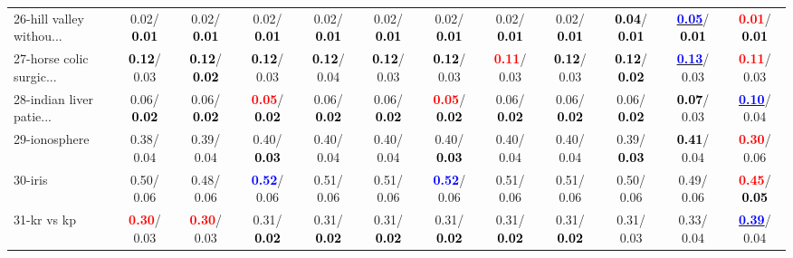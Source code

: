 \begin{table}[h]
\begin{center}
{\begin{tabular}{lc|c|c|c|c|c|c|c|c|c|c}
26-hill valley withou... &   0.02/\textcolor{black}{\textbf{  0.01}} &   0.02/\textcolor{black}{\textbf{  0.01}} &   0.02/\textcolor{black}{\textbf{  0.01}} &   0.02/\textcolor{black}{\textbf{  0.01}} &   0.02/\textcolor{black}{\textbf{  0.01}} &   0.02/\textcolor{black}{\textbf{  0.01}} &   0.02/\textcolor{black}{\textbf{  0.01}} &   0.02/\textcolor{black}{\textbf{  0.01}} & \textcolor{black}{\textbf{  0.04}}/\textcolor{black}{\textbf{  0.01}} & \underline{\textcolor{blue}{\textbf{  0.05}}}/\textcolor{black}{\textbf{  0.01}} & \textcolor{red}{\textbf{  0.01}}/\textcolor{black}{\textbf{  0.01}} \\
27-horse colic surgic... & \textcolor{black}{\textbf{  0.12}}/  0.03 & \textcolor{black}{\textbf{  0.12}}/\textcolor{black}{\textbf{  0.02}} & \textcolor{black}{\textbf{  0.12}}/  0.03 & \textcolor{black}{\textbf{  0.12}}/  0.04 & \textcolor{black}{\textbf{  0.12}}/  0.03 & \textcolor{black}{\textbf{  0.12}}/  0.03 & \textcolor{red}{\textbf{  0.11}}/  0.03 & \textcolor{black}{\textbf{  0.12}}/  0.03 & \textcolor{black}{\textbf{  0.12}}/\textcolor{black}{\textbf{  0.02}} & \underline{\textcolor{blue}{\textbf{  0.13}}}/  0.03 & \textcolor{red}{\textbf{  0.11}}/  0.03 \\
28-indian liver patie... &   0.06/\textcolor{black}{\textbf{  0.02}} &   0.06/\textcolor{black}{\textbf{  0.02}} & \textcolor{red}{\textbf{  0.05}}/\textcolor{black}{\textbf{  0.02}} &   0.06/\textcolor{black}{\textbf{  0.02}} &   0.06/\textcolor{black}{\textbf{  0.02}} & \textcolor{red}{\textbf{  0.05}}/\textcolor{black}{\textbf{  0.02}} &   0.06/\textcolor{black}{\textbf{  0.02}} &   0.06/\textcolor{black}{\textbf{  0.02}} &   0.06/\textcolor{black}{\textbf{  0.02}} & \textcolor{black}{\textbf{  0.07}}/  0.03 & \underline{\textcolor{blue}{\textbf{  0.10}}}/  0.04 \\ \hline
29-ionosphere &   0.38/  0.04 &   0.39/  0.04 &   0.40/\textcolor{black}{\textbf{  0.03}} &   0.40/  0.04 &   0.40/  0.04 &   0.40/\textcolor{black}{\textbf{  0.03}} &   0.40/  0.04 &   0.40/  0.04 &   0.39/\textcolor{black}{\textbf{  0.03}} & \textcolor{black}{\textbf{  0.41}}/  0.04 & \textcolor{red}{\textbf{  0.30}}/  0.06 \\
30-iris &   0.50/  0.06 &   0.48/  0.06 & \textcolor{blue}{\textbf{  0.52}}/  0.06 &   0.51/  0.06 &   0.51/  0.06 & \textcolor{blue}{\textbf{  0.52}}/  0.06 &   0.51/  0.06 &   0.51/  0.06 &   0.50/  0.06 &   0.49/  0.06 & \textcolor{red}{\textbf{  0.45}}/\textcolor{black}{\textbf{  0.05}} \\
31-kr vs kp & \textcolor{red}{\textbf{  0.30}}/  0.03 & \textcolor{red}{\textbf{  0.30}}/  0.03 &   0.31/\textcolor{black}{\textbf{  0.02}} &   0.31/\textcolor{black}{\textbf{  0.02}} &   0.31/\textcolor{black}{\textbf{  0.02}} &   0.31/\textcolor{black}{\textbf{  0.02}} &   0.31/\textcolor{black}{\textbf{  0.02}} &   0.31/\textcolor{black}{\textbf{  0.02}} &   0.31/  0.03 &   0.33/  0.04 & \underline{\textcolor{blue}{\textbf{  0.39}}}/  0.04 \\

\end{tabular}}
\end{center}
\end{table}
